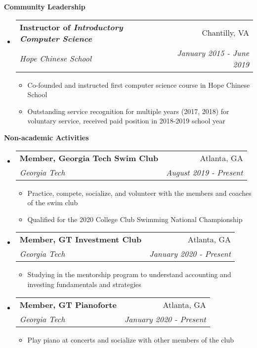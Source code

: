 \documentclass[letterpaper,10pt]{article}
\makeatletter
\newcommand{\resitem}[1]{\item #1 \vspace{-2pt}}
\newcommand{\resheading}[1]{{\large \colorbox{mygrey}{\begin{minipage}{\textwidth}{\textbf{#1 \vphantom{p\^{E}}}}\end{minipage}}}}
\newcommand{\ressubheading}[4]{
\begin{tabular*}{7.0in}{l@{\extracolsep{\fill}}r}
		\textbf{#1} & #2 \\
		\textit{#3} & \textit{#4} \\
\end{tabular*}\vspace{-6pt}}
\makeatother
\begin{document}
\resheading{Community Leadership}
\begin{itemize}
\item
	\ressubheading{Instructor of \textit{Introductory Computer Science}}{Chantilly, VA}{Hope Chinese School}{January 2015 - June 2019}
	\begin{itemize}
	    \resitem{Co-founded and instructed first computer science course in Hope Chinese School}
	    \resitem{Outstanding service recognition for multiple years (2017, 2018) for voluntary service, received paid position in 2018-2019 school year}
	\end{itemize}
	
\end{itemize}

\resheading{Non-academic Activities}
\begin{itemize}
\item
    \ressubheading{Member, Georgia Tech Swim Club}{Atlanta, GA}{Georgia Tech}{August 2019 - Present}
    \begin{itemize}
        \resitem{Practice, compete, socialize, and volunteer with the members and coaches of the swim club}
        \resitem{Qualified for the 2020 College Club Swimming National Championship}
    \end{itemize}
\item
    \ressubheading{Member, GT Investment Club}{Atlanta, GA}{Georgia Tech}{January 2020 - Present}
    \begin{itemize}
        \resitem{Studying in the mentorship program to understand accounting and investing fundamentals and strategies}
    \end{itemize}
\item
    \ressubheading{Member, GT Pianoforte}{Atlanta, GA}{Georgia Tech}{January 2020 - Present}
    \begin{itemize}
        \resitem{Play piano at concerts and socialize with other members of the club}
    \end{itemize}
\end{itemize}
\end{document}
